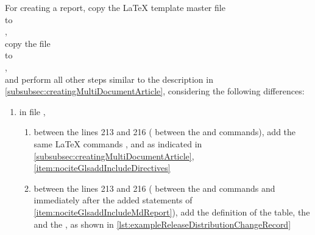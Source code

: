 For creating a \multidoc report, copy the \LaTeX{} template master file \\
 to \\
, \\
copy the file \\
 to \\
, \\
and perform all other steps similar to the description in
\autoref{subsubsec:creatingMultiDocumentArticle}, considering the following
differences:
\begin{enumerate}

\item in file ,
  \begin{enumerate}
  \item \label{item:nociteGlsaddIncludeMdReport} between the lines 213 and
    216 (\IE{} between the \latexcmd{\printbibliography} and
    \latexcmd{\appendix} commands), add the same \LaTeX{} commands
    \latexcmd{\nocite}, \latexcmd{\glsadd} and \latexcmd{} as
    indicated in \autoref{subsubsec:creatingMultiDocumentArticle},
    \autoref{item:nociteGlsaddIncludeDirectives}

  \item between the lines 213 and 216 (\IE{} between the
    \latexcmd{\printbibliography} and \latexcmd{\appendix} commands and
    immediately after the added statements of
    \autoref{item:nociteGlsaddIncludeMdReport}), add the definition of the
     table, the  and the , as shown
    in \autoref{lst:exampleReleaseDistributionChangeRecord}
  \end{enumerate}


\end{enumerate}
